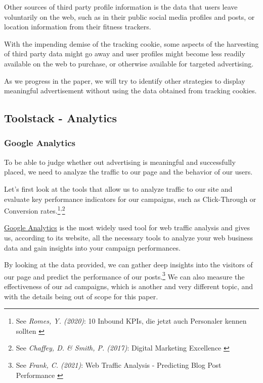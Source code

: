 Other sources of third party profile information is the data that users leave voluntarily on the web, such as in their public social media profiles and posts, or location information from their fitness trackers.

With the impending demise of the tracking cookie, some aspects of the harvesting of third party data might go away and user profiles might become less readily available on the web to purchase, or otherwise available for targeted advertising.

As we progress in the paper, we will try to identify other strategies to display meaningful advertisement without using the data obtained from tracking cookies.

\subsection{Toolstack - Analytics}

\subsubsection{Google Analytics}

To be able to judge whether out advertising is meaningful and successfully placed, we need to analyze the traffic to our page and the behavior of our users.

Let's first look at the tools that allow us to analyze traffic to our site and evaluate key performance indicators for our campaigns, such as Click-Through or Conversion rates.\footnote{See \textit{Romes, Y. (2020)}: 10 Inbound KPIs, die jetzt auch Personaler kennen sollten \cite{inboundKPI}}\textsuperscript{,}\footnote{See \textit{Chaffey, D. \& Smith, P. (2017)}: Digital Marketing Excellence \cite{digitalMarketing}}

\href{https://analytics.google.com/}{Google Analytics} is the most widely used tool for web traffic analysis and gives us, according to its website, all the necessary tools to analyze your web business data and gain insights into your campaign performances.

By looking at the data provided, we can gather deep insights into the visitors of our page and predict the performance of our posts.\footnote{See \textit{Frank, C. (2021)}: Web Traffic Analysis - Predicting Blog Post Performance \cite{previousBigdata}} We can also measure the effectiveness of our ad campaigns, which is another and very different topic, and with the details being out of scope for this paper.

